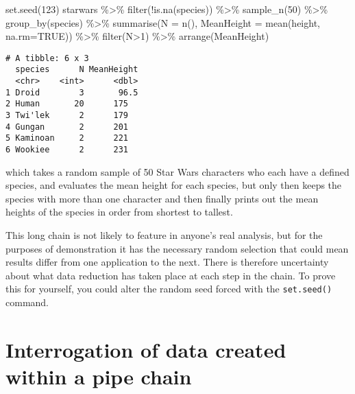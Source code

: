 \documentclass[
]{book}
\newenvironment{Shaded}{\begin{snugshade}}{\end{snugshade}}
\newcommand{\AttributeTok}[1]{\textcolor[rgb]{0.77,0.63,0.00}{#1}}
\newcommand{\ConstantTok}[1]{\textcolor[rgb]{0.00,0.00,0.00}{#1}}
\newcommand{\DecValTok}[1]{\textcolor[rgb]{0.00,0.00,0.81}{#1}}
\newcommand{\FunctionTok}[1]{\textcolor[rgb]{0.00,0.00,0.00}{#1}}
\newcommand{\NormalTok}[1]{#1}
\newcommand{\SpecialCharTok}[1]{\textcolor[rgb]{0.00,0.00,0.00}{#1}}
\begin{document}
\begin{Shaded}
\begin{Highlighting}[]
\FunctionTok{set.seed}\NormalTok{(}\DecValTok{123}\NormalTok{)}
\NormalTok{starwars }\SpecialCharTok{\%\textgreater{}\%} \FunctionTok{filter}\NormalTok{(}\SpecialCharTok{!}\FunctionTok{is.na}\NormalTok{(species)) }\SpecialCharTok{\%\textgreater{}\%} \FunctionTok{sample\_n}\NormalTok{(}\DecValTok{50}\NormalTok{) }\SpecialCharTok{\%\textgreater{}\%} \FunctionTok{group\_by}\NormalTok{(species) }\SpecialCharTok{\%\textgreater{}\%} \FunctionTok{summarise}\NormalTok{(}\AttributeTok{N =} \FunctionTok{n}\NormalTok{(), }\AttributeTok{MeanHeight =} \FunctionTok{mean}\NormalTok{(height, }\AttributeTok{na.rm=}\ConstantTok{TRUE}\NormalTok{)) }\SpecialCharTok{\%\textgreater{}\%} \FunctionTok{filter}\NormalTok{(N}\SpecialCharTok{\textgreater{}}\DecValTok{1}\NormalTok{) }\SpecialCharTok{\%\textgreater{}\%} \FunctionTok{arrange}\NormalTok{(MeanHeight)}
\end{Highlighting}
\end{Shaded}

\begin{verbatim}
# A tibble: 6 x 3
  species      N MeanHeight
  <chr>    <int>      <dbl>
1 Droid        3       96.5
2 Human       20      175  
3 Twi'lek      2      179  
4 Gungan       2      201  
5 Kaminoan     2      221  
6 Wookiee      2      231  
\end{verbatim}

which takes a random sample of 50 Star Wars characters who each have a defined species, and evaluates the mean height for each species, but only then keeps the species with more than one character and then finally prints out the mean heights of the species in order from shortest to tallest.

This long chain is not likely to feature in anyone's real analysis, but for the purposes of demonstration it has the necessary random selection that could mean results differ from one application to the next. There is therefore uncertainty about what data reduction has taken place at each step in the chain. To prove this for yourself, you could alter the random seed forced with the \texttt{set.seed()} command.

\hypertarget{interrogation-of-data-created-within-a-pipe-chain}{%
\section{Interrogation of data created within a pipe chain}\label{interrogation-of-data-created-within-a-pipe-chain}}
\end{document}
